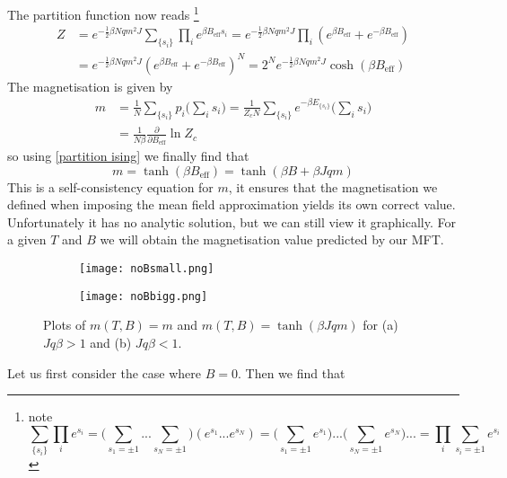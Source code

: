 \documentclass[a4paper,11pt,oneside]{book}
\begin{document}
The partition function now reads \footnote{note
\begin{equation*}
    \sum_{\{s_i\}} \prod_i e^{s_i} = \bigg(\sum_{s_1=\pm1} ... \sum_{s_N=\pm1}\bigg)(e^{s_1}... e^{s_N}) = \bigg(\sum_{s_1 = \pm 1} e^{s_1}\bigg)...\bigg(\sum_{s_N = \pm 1} e^{s_N}\bigg)... = \prod_i \sum_{s_i=\pm1} e^{s_i} 
\end{equation*}}
\begin{align}\label{partition ising}
    Z  &= e^{-\frac{1}{2}\beta N qm^2J} \sum_{\{s_i\}} \prod_i e^{\beta B_{\text{eff}} s_i}= e^{-\frac{1}{2}\beta N qm^2J}  \prod_i (e^{\beta B_{\text{eff}}}+e^{-\beta B_\text{eff}})\\
    &=e^{-\frac{1}{2}\beta N qm^2J}(e^{\beta B_{\text{eff}}}+e^{-\beta B_\text{eff}})^N = 2^N e^{-\frac{1}{2}\beta N qm^2J} \cosh(\beta B_{\text{eff}})
\end{align}
The magnetisation is given by
\begin{align}
    m &= \frac{1}{N} \sum_{\{s_i\}} p_i \bigg(\sum_i s_i\bigg) = \frac{1}{Z_{c}N} \sum_{\{s_i\}} e^{-\beta E_{\{s_i\}}}\bigg(\sum_i s_i\bigg)\\
    &=\frac{1}{N \beta}\frac{\partial}{\partial B_{\text{eff}}}\ln Z_c 
\end{align}
so using \eqref{partition ising} we finally find that
\begin{equation}\label{consistency}
    m =\tanh(\beta B_{\text{eff}}) = \tanh(\beta B + \beta Jqm)
\end{equation}
This is a self-consistency equation for $m$, it ensures that the magnetisation we defined when imposing the mean field approximation yields its own correct value. Unfortunately it has no analytic solution, but we can still view it graphically. For a given $T$ and $B$ we will obtain the magnetisation value predicted by our MFT.
\begin{figure}[h!]
\centering
\begin{subfigure}{0.4\textwidth}
  \centering
  \texttt{[image: noBsmall.png]}
  \label{fig:sub1}
  \caption{}
\end{subfigure}%
\begin{subfigure}{0.4\textwidth}
  \centering
  \texttt{[image: noBbigg.png]}
  \label{fig:sub2}
  \caption{}
\end{subfigure}
\caption{Plots of $m(T,B)=m$ and $m(T,B)=\tanh(\beta Jqm)$ for (a) $Jq\beta>1$ and (b) $Jq\beta<1$.}
\label{fig:test}
\end{figure}
Let us first consider the case where $B=0$. Then we find that
\end{document}
